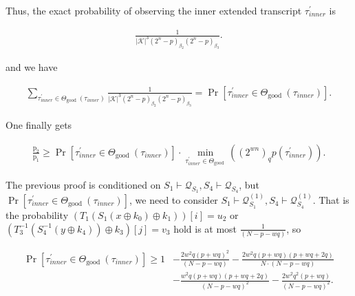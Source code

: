Thus, the exact probability of observing the inner extended transcript $\tau_{inner}^{\prime}$ is

$$
\begin{aligned}
\frac{1}{|\mathcal{K}|^{3}\left(2^{n}-p\right)_{\beta_{2}}\left(2^{n}-p\right)_{\beta_{3}}}.
\end{aligned}
$$

and we have

$$
\begin{aligned}
\sum_{\tau_{inner}^{\prime} \in \Theta_{\text {good }}(\tau_{inner})} \frac{1}{|\mathcal{K}|^{3}\left(2^{n}-p\right)_{\beta_{2}}\left(2^{n}-p\right)_{\beta_{3}}} = \operatorname{Pr}\left[ \tau_{inner}^{\prime} \in \Theta_{\text {good }}(\tau_{inner})\right].
\end{aligned}
$$

One finally gets

\begin{equation}
\begin{aligned}
\frac{\mathrm{p}_{2}}{\mathrm{p}_{1}} \geq \operatorname{Pr}\left[ \tau_{inner}^{\prime} \in \Theta_{\text {good }}(\tau_{inner})\right] \cdot \min _{\tau_{inner}^{\prime} \in \Theta_{\text {good }}}((2^{w n})_{q} p(\tau_{inner}^{\prime})).
\end{aligned}
\end{equation}

The previous proof is conditioned on $S_{1} \vdash \mathcal{Q}_{S_{1}}, S_{4} \vdash \mathcal{Q}_{S_{4}}$, but $\operatorname{Pr}\left[ \tau_{inner}^{\prime} \in \Theta_{\text {good }}(\tau_{inner})\right]$, we need to consider $S_{1} \vdash \mathcal{Q}_{S_{1}}^{(1)}, S_{4} \vdash \mathcal{Q}_{S_{4}}^{(1)}$. That is the probability $\left(T_{1}\left(S_{1}\left(x \oplus k_{0}\right) \oplus k_{1}\right)\right)[i]=u_2$ or $\left(T_{3}^{-1}\left(S_{4}^{-1}\left(y \oplus k_{4}\right)\right) \oplus k_{3}\right)[j]=v_3$ hold is at most $\frac{1}{(N-p-w q)}$, so

\begin{equation}
\begin{aligned}
\operatorname{Pr}\left[ \tau_{inner}^{\prime} \in \Theta_{\text {good }}(\tau_{inner})\right] \geq 1&- \frac{2 w^{2} q (p+w q)^{2}}{(N-p-w q)} -\frac{2 w^{2} q (p+w q)(p+w q+2 q)}{N \cdot (N-p-w q)}\\
&- \frac{w^{2} q (p+w q)(p+w q+2 q)}{(N-p-w q)^2} - \frac{2 w^{2} q^{2} (p+w q)}{(N- p- wq)^2}.
\end{aligned}
\end{equation}


